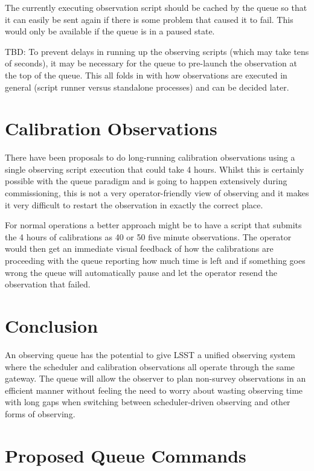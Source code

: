 \documentclass[TS,toc,lsstdraft]{lsstdoc}
\begin{document}
The currently executing observation script should be cached by the queue so that it can easily be sent again if there is some problem that caused it to fail.
This would only be available if the queue is in a paused state.

TBD: To prevent delays in running up the observing scripts (which may take tens of seconds), it may be necessary for the queue to pre-launch the observation at the top of the queue.
This all folds in with how observations are executed in general (script runner versus standalone processes) and can be decided later.

\section{Calibration Observations}

There have been proposals to do long-running calibration observations using a single observing script execution that could take 4 hours.
Whilst this is certainly possible with the queue paradigm and is going to happen extensively during commissioning, this is not a very operator-friendly view of observing and it makes it very difficult to restart the observation in exactly the correct place.

For normal operations a better approach might be to have a script that submits the 4 hours of calibrations as 40 or 50 five minute observations.
The operator would then get an immediate visual feedback of how the calibrations are proceeding with the queue reporting how much time is left and if something goes wrong the queue will automatically pause and let the operator resend the observation that failed.

\section{Conclusion}

An observing queue has the potential to give LSST a unified observing system where the scheduler and calibration observations all operate through the same gateway.
The queue will allow the observer to plan non-survey observations in an efficient manner without feeling the need to worry about wasting observing time with long gaps when switching between scheduler-driven observing and other forms of observing.

\appendix
\section{Proposed Queue Commands}
\end{document}
